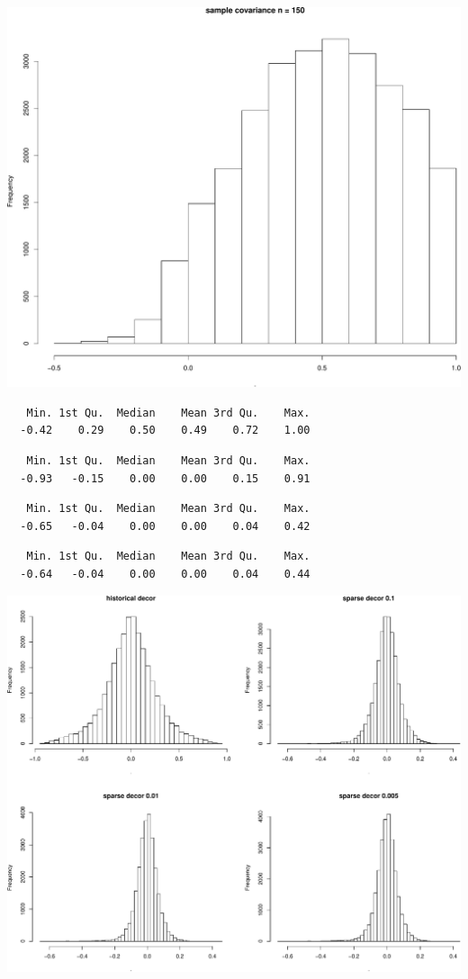 \documentclass[]{article}
\begin{document}
\includegraphics{Low_levels_covariance_sparse_decorr_files/figure-latex/unnamed-chunk-3-1.pdf}

\begin{verbatim}
   Min. 1st Qu.  Median    Mean 3rd Qu.    Max. 
  -0.42    0.29    0.50    0.49    0.72    1.00 
\end{verbatim}

\begin{verbatim}
   Min. 1st Qu.  Median    Mean 3rd Qu.    Max. 
  -0.93   -0.15    0.00    0.00    0.15    0.91 
\end{verbatim}

\begin{verbatim}
   Min. 1st Qu.  Median    Mean 3rd Qu.    Max. 
  -0.65   -0.04    0.00    0.00    0.04    0.42 
\end{verbatim}

\begin{verbatim}
   Min. 1st Qu.  Median    Mean 3rd Qu.    Max. 
  -0.64   -0.04    0.00    0.00    0.04    0.44 
\end{verbatim}

\includegraphics{Low_levels_covariance_sparse_decorr_files/figure-latex/unnamed-chunk-3-2.pdf}
\end{document}
